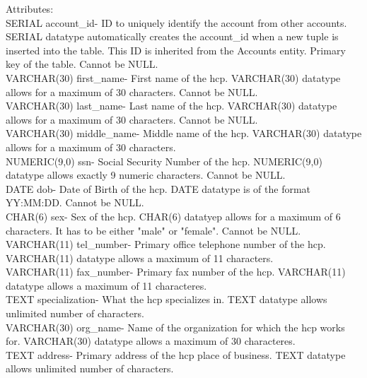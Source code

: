 \documentclass[12pt]{report}
\begin{document}
Attributes:\\
SERIAL account\_id- ID to uniquely identify the account from other accounts. SERIAL datatype automatically creates the account\_id when a new tuple is inserted into the table.  This ID is inherited from the Accounts entity. Primary key of the table.  Cannot be NULL.\\

VARCHAR(30) first\_name-  First name of the hcp.  VARCHAR(30) datatype allows for a maximum of 30 characters.  Cannot be NULL.\\

VARCHAR(30) last\_name- Last name of the hcp.  VARCHAR(30) datatype allows for a maximum of 30 characters.  Cannot be NULL.\\ 

VARCHAR(30) middle\_name- Middle name of the hcp. VARCHAR(30) datatype allows for a maximum of 30 characters.\\

NUMERIC(9,0) ssn- Social Security Number of the hcp. NUMERIC(9,0) datatype allows exactly 9 numeric characters.  Cannot be NULL.\\

DATE dob- Date of Birth of the hcp.  DATE datatype is of the format YY:MM:DD.  Cannot be NULL.\\

CHAR(6) sex- Sex of the hcp. CHAR(6) datatyep allows for a maximum of 6 characters.  It has to be either "male" or "female".  Cannot be NULL.\\

VARCHAR(11) tel\_number- Primary office telephone number of the hcp.  VARCHAR(11) datatype allows a maximum of 11 characters.\\

VARCHAR(11) fax\_number- Primary fax number of the hcp.  VARCHAR(11) datatype allows a maximum of 11 characteres.\\

TEXT specialization- What the hcp specializes in.  TEXT datatype allows unlimited number of characters.\\

VARCHAR(30) org\_name- Name of the organization for which the hcp works for.  VARCHAR(30) datatype allows a maximum of 30 characteres.\\

TEXT address- Primary address of the hcp place of business.  TEXT datatype allows unlimited number of characters.\\ \\
\end{document}
